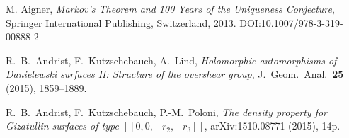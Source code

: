 




M. Aigner, \emph{Markov's Theorem and 100 Years of the Uniqueness Conjecture}, Springer International Publishing, Switzerland, 2013. DOI:10.1007/978-3-319-00888-2







R.~B.~Andrist, F.~Kutzschebauch, A.~Lind, \emph{
Holomorphic automorphisms of Danielewski surfaces II: Structure of the overshear group},
J.\ Geom.\ Anal.\ \textbf{25} (2015), 1859--1889.

R.~B.~Andrist, F.~Kutzschebauch, P.-M.~Poloni, \emph{The density property for Gizatullin surfaces of type $[[0,0,-r_2,-r_3]]$},  arXiv:1510.08771 (2015), 14p.

